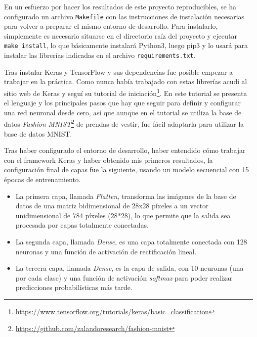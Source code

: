 \bigskip

En un esfuerzo por hacer los resultados de este proyecto reproducibles, se ha configurado un archivo \lstinline{Makefile} con las instrucciones de instalación necesarias para volver a preparar el mismo entorno de desarrollo. Para instalarlo, simplemente es necesario situarse en el directorio raíz del proyecto y ejecutar \lstinline{make install}, lo que básicamente instalará Python3, luego pip3 y lo usará para instalar las librerías indicadas en el archivo \lstinline{requirements.txt}.

\bigskip

Tras instalar Keras y TensorFlow y sus dependencias fue posible empezar a trabajar en la práctica. Como nunca había trabajado con estas librerías acudí al sitio web de Keras y seguí su tutorial de iniciación\footnote{\url{https://www.tensorflow.org/tutorials/keras/basic_classification}}. En este tutorial se presenta el lenguaje y los principales pasos que hay que seguir para definir y configurar una red neuronal desde cero, así que aunque en el tutorial se utiliza la base de datos \textit{Fashion MNIST}\footnote{\url{https://github.com/zalandoresearch/fashion-mnist}} de prendas de vestir, fue fácil adaptarla para utilizar la base de datos MNIST.

\bigskip

Tras haber configurado el entorno de desarrollo, haber entendido cómo trabajar con  el framework Keras y haber obtenido mis primeros resultados, la configuración final de capas fue la siguiente, usando un modelo secuencial con 15 épocas de entrenamiento.

\bigskip

\begin{itemize}
  \item La primera capa, llamada \textit{Flatten}, transforma  las imágenes de la base de datos de una matriz bidimensional de 28x28 píxeles a un vector unidimensional de 784 píxeles (28*28), lo que permite que la salida sea procesada por capas totalmente conectadas.
  \item La segunda capa, llamada \textit{Dense}, es una capa totalmente conectada con 128 neuronas y una función de activación de rectificación lineal.
  \item La tercera capa, llamada \textit{Dense}, es la capa de salida, con 10 neuronas (una por cada clase) y una función de activación \textit{softmax} para poder realizar predicciones probabilísticas más tarde.
\end{itemize}

